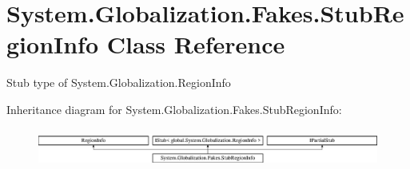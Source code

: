 \hypertarget{class_system_1_1_globalization_1_1_fakes_1_1_stub_region_info}{\section{System.\-Globalization.\-Fakes.\-Stub\-Region\-Info Class Reference}
\label{class_system_1_1_globalization_1_1_fakes_1_1_stub_region_info}
}


Stub type of System.\-Globalization.\-Region\-Info 


Inheritance diagram for System.\-Globalization.\-Fakes.\-Stub\-Region\-Info\-:\begin{figure}[H]
\begin{center}
\leavevmode
\includegraphics[height=1.287356cm]{class_system_1_1_globalization_1_1_fakes_1_1_stub_region_info}
\end{center}
\end{figure}
